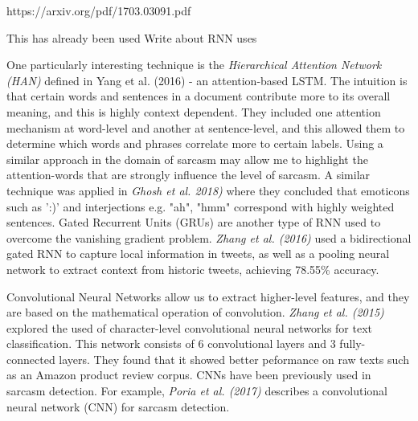 \documentclass[12pt,a4paper]{article}
\begin{document}
https://arxiv.org/pdf/1703.03091.pdf

This has already been used
Write about RNN uses

One particularly interesting technique is the \textit{Hierarchical Attention Network (HAN)} defined in Yang et al. (2016) \cite{yang2016hierarchical} - an attention-based LSTM. The intuition is that certain words and sentences in a document contribute more to its overall meaning, and this is highly context dependent. They included one attention mechanism at word-level and another at sentence-level, and this allowed them to determine which words and phrases correlate more to certain labels. Using a similar approach in the domain of sarcasm may allow me to highlight the attention-words that are strongly influence the level of sarcasm. A similar technique was applied in \textit{Ghosh et al. 2018)} \cite{ghosh2018sarcasm} where they concluded that emoticons such as ':)' and interjections e.g. "ah", "hmm" correspond with highly weighted sentences. 
Gated Recurrent Units (GRUs) are another type of RNN used to overcome the vanishing gradient problem.  \textit{Zhang et al. (2016)} \cite{zhang2016tweet} used a bidirectional gated RNN to capture local information in tweets, as well as a pooling neural network to extract context from historic tweets, achieving 78.55\% accuracy.

Convolutional Neural Networks allow us to extract higher-level features, and they are based on the mathematical operation of convolution. \textit{Zhang et al. (2015)}  \cite{zhang2015character} explored the used of character-level convolutional neural networks for text classification. This network consists of 6 convolutional layers and 3 fully-connected layers. They found that it showed better peformance on raw texts such as an Amazon product review corpus. CNNs have been previously used in sarcasm detection. For example, \textit{Poria et al. (2017)} \cite{poria2016deeper} describes a convolutional neural network (CNN) for sarcasm detection. \\


\end{document}

